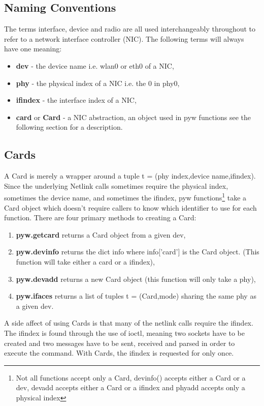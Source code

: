 \documentclass[11pt]{article}
\begin{document}
\subsection{Naming Conventions}
The terms interface, device and radio are all used interchangeably throughout to 
refer to a network interface controller (NIC). The following terms will always
have one meaning:
\begin{itemize}
\item \textbf{dev} - the device name i.e. wlan0 or eth0 of a NIC, 
\item \textbf{phy} - the physical index of a NIC i.e. the 0 in phy0,
\item \textbf{ifindex} - the interface index of a NIC,
\item \textbf{card} or \textbf{Card} - a NIC abstraction, an object used in pyw 
functions see the following section for a description. 
\end{itemize}

\subsection{Cards}
A Card is merely a wrapper around a tuple t = (phy index,device name,ifindex). 
Since the underlying Netlink calls sometimes require the physical index, sometimes 
the device name, and sometimes the ifindex, pyw functions\footnote{Not all functions 
accept only a Card, devinfo() accepts either a Card or a dev, devadd accepts either a 
Card or a ifindex and phyadd accepts only a physical index} take a Card object which 
doesn't require callers to know which identifier to use for each function. There are
four primary methods to creating a Card: 
\begin{enumerate}
\item \textbf{pyw.getcard} returns a Card object from a given dev,
\item \textbf{pyw.devinfo} returns the dict info where info['card'] is the Card 
object. (This function will take either a card or a ifindex),
\item \textbf{pyw.devadd} returns a new Card object (this function will only take
a phy), 
\item \textbf{pyw.ifaces} returns a list of tuples t = (Card,mode) sharing the 
same phy as a given dev.
\end{enumerate}

A side affect of using Cards is that many of the netlink calls require the ifindex.
The ifindex is found through the use of ioctl, meaning two sockets have to be 
created and two messages have to be sent, received and parsed in order to execute
the command. With Cards, the ifindex is requested for only once. \\
\end{document}
